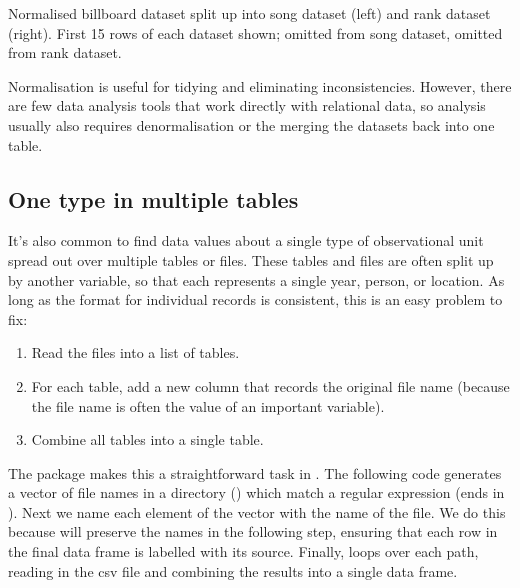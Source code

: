 \documentclass[article]{jss}
\begin{document}
\begin{table}
  \centering
  \hspace{1em}%
  

  \caption{Normalised billboard dataset split up into song dataset (left) and rank dataset (right). First 15 rows of each dataset shown;  omitted from song dataset,  omitted from rank dataset.}
  \label{tbl:billboard-normal}
\end{table}

Normalisation is useful for tidying and eliminating inconsistencies. However, there are few data analysis tools that work directly with relational data, so analysis usually also requires denormalisation or the merging the datasets back into one table. 


\subsection{One type in multiple tables}

It's also common to find data values about a single type of observational unit spread out over multiple tables or files. These tables and files are often split up by another variable, so that each represents a single year, person, or location. As long as the format for individual records is consistent, this is an easy problem to fix: 

\begin{enumerate}
  \item Read the files into a list of tables.

\item For each table, add a new column that records the original file name (because the file name is often the value of an important variable).

  \item Combine all tables into a single table. 
\end{enumerate}

The  package makes this a straightforward task in . The following code generates a vector of file names in a directory () which match a regular expression (ends in ). Next we name each element of the vector with the name of the file. We do this because  will preserve the names in the following step, ensuring that each row in the final data frame is labelled with its source. Finally,  loops over each path, reading in the csv file and combining the results into a single data frame.
\end{document}
